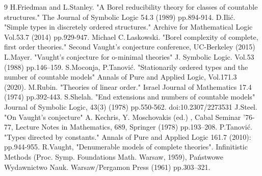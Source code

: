 \documentclass[12pt]{amsart}
\theoremstyle{definition}
\begin{document}
 
\begin{thebibliography}{9}
  H.Friedman and L.Stanley. "A Borel reducibility theory for classes of countable structures." The Journal of Symbolic Logic 54.3 (1989)  pp.894-914.
 D.Ili\'c. "Simple types in discretely ordered structures." Archive for Mathematical Logic Vol.53.7 (2014)  pp.929-947.
 Michael C.\,Laskowski. "Borel complexity of complete, first order theories." Second Vaught’s conjecture conference, UC-Berkeley (2015) 
 L.Mayer. "Vaught's conjecture for o-minimal theories" J. Symbolic Logic. Vol.53 (1988) pp.146–159.
 S.Moconja, P.Tanovi\'c.
"Stationarily ordered types and the number of countable models" Annals of Pure and Applied Logic,
Vol.171.3 (2020).
M.Rubin. "Theories of linear order." Israel Journal of Mathematics 17.4 (1974) pp.392-443.
 S.Shelah.  "End extensions and numbers of countable models" Journal of Symbolic Logic, 43(3) (1978) pp.550-562. doi:10.2307/2273531
J.Steel. "On Vaught's conjecture" A. Kechris, Y. Moschovakis (ed.) , Cabal Seminar '76-77, Lecture Notes in Mathematics, 689, Springer (1978) pp.193–208.
 P.Tanovi\'c. "Types directed by constants." Annals of Pure and Applied Logic 161.7 (2010): pp.944-955.
R.Vaught, "Denumerable models of complete theories". Infinitistic Methods (Proc. Symp. Foundations Math.  Warsaw, 1959), Państwowe Wydawnictwo Nauk. Warsaw/Pergamon Press (1961) pp.303–321.

\end{thebibliography}
\end{document}
